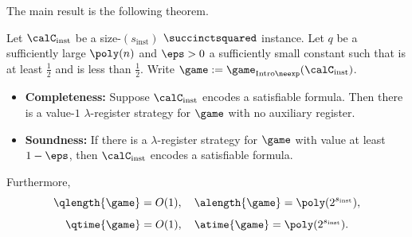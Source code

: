 The main result  is the following theorem.

\begin{theorem}\label{thm:main-result-of-this-part}
Let $\calC_{\mathrm{inst}}$ be a size-$(s_{\mathrm{inst}})$ $\succinctsquared$ instance.
Let $q$ be a sufficiently large $\poly(n)$ and $\eps > 0$ a sufficiently small constant such that  is at least $\tfrac{1}{2}$
and  is less than $\tfrac{1}{2}$.
Write $\game := \game_{\mathrm{Intro}\neexp}(\calC_{\mathrm{inst}})$.
\begin{itemize}
\item[$\circ$] \textbf{Completeness:}
		Suppose $\calC_{\mathrm{inst}}$ encodes a satisfiable formula.
		Then there is a value-$1$ $\lambda$-register strategy for $\game$ with no auxiliary register.
\item[$\circ$] \textbf{Soundness:}
		If there is a $\lambda$-register strategy for $\game$ with value at least $1-\eps$,
		then $\calC_{\mathrm{inst}}$ encodes a satisfiable formula.
\end{itemize}
Furthermore,
\begin{equation*}
\qlength{\game} = O(1), \quad
\alength{\game} = \poly(2^{s_\mathrm{inst}}),
\end{equation*}
\begin{equation*}
\qtime{\game} = O(1), \quad
\atime{\game} = \poly(2^{s_\mathrm{inst}}).
\end{equation*}
\end{theorem}

